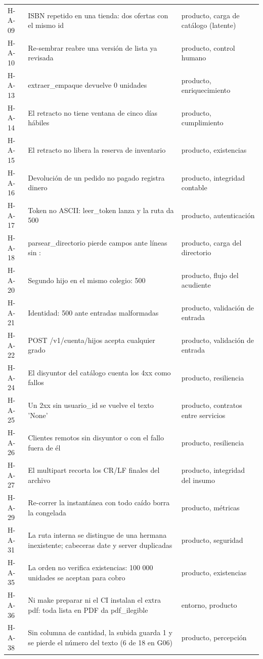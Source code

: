 \begin{longtable}{@{}p{1.3cm}p{10.6cm}p{2.6cm}@{}}
H-A-09 & ISBN repetido en una tienda: dos ofertas con el mismo id & producto, carga de catálogo (latente) \\
H-A-10 & Re-sembrar reabre una versión de lista ya revisada & producto, control humano \\
H-A-13 & extraer\_empaque devuelve 0 unidades & producto, enriquecimiento \\
H-A-14 & El retracto no tiene ventana de cinco días hábiles & producto, cumplimiento \\
H-A-15 & El retracto no libera la reserva de inventario & producto, existencias \\
H-A-16 & Devolución de un pedido no pagado registra dinero & producto, integridad contable \\
H-A-17 & Token no ASCII: leer\_token lanza y la ruta da 500 & producto, autenticación \\
H-A-18 & parsear\_directorio pierde campos ante líneas sin : & producto, carga del directorio \\
H-A-20 & Segundo hijo en el mismo colegio: 500 & producto, flujo del acudiente \\
H-A-21 & Identidad: 500 ante entradas malformadas & producto, validación de entrada \\
H-A-22 & POST /v1/cuenta/hijos acepta cualquier grado & producto, validación de entrada \\
H-A-24 & El disyuntor del catálogo cuenta los 4xx como fallos & producto, resiliencia \\
H-A-25 & Un 2xx sin usuario\_id se vuelve el texto 'None' & producto, contratos entre servicios \\
H-A-26 & Clientes remotos sin disyuntor o con el fallo fuera de él & producto, resiliencia \\
H-A-27 & El multipart recorta los CR/LF finales del archivo & producto, integridad del insumo \\
H-A-29 & Re-correr la instantánea con todo caído borra la congelada & producto, métricas \\
H-A-31 & La ruta interna se distingue de una hermana inexistente; cabeceras date y server duplicadas & producto, seguridad \\
H-A-35 & La orden no verifica existencias: 100 000 unidades se aceptan para cobro & producto, existencias \\
H-A-36 & Ni make preparar ni el CI instalan el extra pdf: toda lista en PDF da pdf\_ilegible & entorno, producto \\
H-A-38 & Sin columna de cantidad, la subida guarda 1 y se pierde el número del texto (6 de 18 en G06) & producto, percepción \\

\end{longtable}

